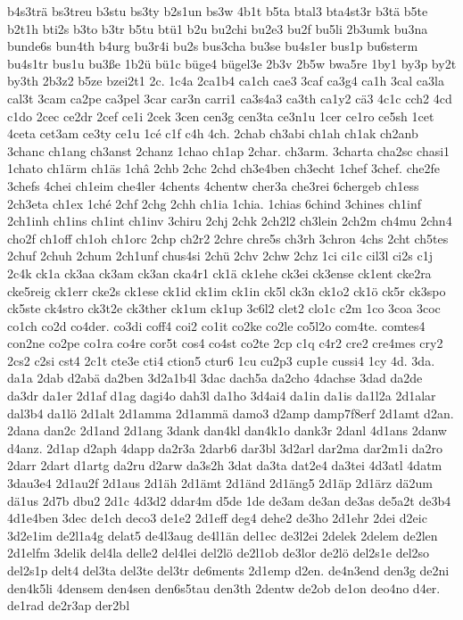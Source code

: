 {b4s3trä
bs3treu
b3stu
bs3ty
b2s1un
bs3w
4b1t
b5ta
btal3
bta4st3r
b3tä
b5te
b2t1h
bti2s
b3to
b3tr
b5tu
btü1
b2u
bu2chi
bu2e3
bu2f
bu5li
2b3umk
bu3na
bunde6s
bun4th
b4urg
bu3r4i
bu2s
bus3cha
bu3se
bu4s1er
bus1p
bu6sterm
bu4s1tr
bus1u
bu3ße
1b2ü
bü1c
büge4
bügel3e
2b3v
2b5w
bwa5re
1by1
by3p
by2t
by3th
2b3z2
b5ze
bzei2t1
2c.
1c4a
2ca1b4
ca1ch
cae3
3caf
ca3g4
ca1h
3cal
ca3la
cal3t
3cam
ca2pe
ca3pel
3car
car3n
carri1
ca3s4a3
ca3th
ca1y2
cä3
4c1c
cch2
4cd
c1do
2cec
ce2dr
2cef
ce1i
2cek
3cen
cen3g
cen3ta
ce3n1u
1cer
ce1ro
ce5sh
1cet
4ceta
cet3am
ce3ty
ce1u
1cé
c1f
c4h
4ch.
2chab
ch3abi
ch1ah
ch1ak
ch2anb
3chanc
ch1ang
ch3anst
2chanz
1chao
ch1ap
2char.
ch3arm.
3charta
cha2sc
chasi1
1chato
ch1ärm
ch1äs
1châ
2chb
2chc
2chd
ch3e4ben
ch3echt
1chef
3chef.
che2fe
3chefs
4chei
ch1eim
che4ler
4chents
4chentw
cher3a
che3rei
6chergeb
ch1ess
2ch3eta
ch1ex
1ché
2chf
2chg
2chh
ch1ia
1chia.
1chias
6chind
3chines
ch1inf
2ch1inh
ch1ins
ch1int
ch1inv
3chiru
2chj
2chk
2ch2l2
ch3lein
2ch2m
ch4mu
2chn4
cho2f
ch1off
ch1oh
ch1orc
2chp
ch2r2
2chre
chre5s
ch3rh
3chron
4chs
2cht
ch5tes
2chuf
2chuh
2chum
2ch1unf
chus4si
2chü
2chv
2chw
2chz
1ci
ci1c
cil3l
ci2s
c1j
2c4k
ck1a
ck3aa
ck3am
ck3an
cka4r1
ck1ä
ck1ehe
ck3ei
ck3ense
ck1ent
cke2ra
cke5reig
ck1err
cke2s
ck1ese
ck1id
ck1im
ck1in
ck5l
ck3n
ck1o2
ck1ö
ck5r
ck3spo
ck5ste
ck4stro
ck3t2e
ck3ther
ck1um
ck1up
3c6l2
clet2
clo1c
c2m
1co
3coa
3coc
co1ch
co2d
co4der.
co3di
coff4
coi2
co1it
co2ke
co2le
co5l2o
com4te.
comtes4
con2ne
co2pe
co1ra
co4re
cor5t
cos4
co4st
co2te
2cp
c1q
c4r2
cre2
cre4mes
cry2
2cs2
c2si
cst4
2c1t
cte3e
cti4
ction5
ctur6
1cu
cu2p3
cup1e
cussi4
1cy
4d.
3da.
da1a
2dab
d2abä
da2ben
3d2a1b4l
3dac
dach5a
da2cho
4dachse
3dad
da2de
da3dr
da1er
2d1af
d1ag
dagi4o
dah3l
da1ho
3d4ai4
da1in
da1is
da1l2a
2d1alar
dal3b4
da1lö
2d1alt
2d1amma
2d1ammä
damo3
d2amp
damp7f8erf
2d1amt
d2an.
2dana
dan2c
2d1and
2d1ang
3dank
dan4kl
dan4k1o
dank3r
2danl
4d1ans
2danw
d4anz.
2d1ap
d2aph
4dapp
da2r3a
2darb6
dar3bl
3d2arl
dar2ma
dar2m1i
da2ro
2darr
2dart
d1artg
da2ru
d2arw
da3s2h
3dat
da3ta
dat2e4
da3tei
4d3atl
4datm
3dau3e4
2d1au2f
2d1aus
2d1äh
2d1ämt
2d1änd
2d1äng5
2d1äp
2d1ärz
dä2um
dä1us
2d7b
dbu2
2d1c
4d3d2
ddar4m
d5de
1de
de3am
de3an
de3as
de5a2t
de3b4
4d1e4ben
3dec
de1ch
deco3
de1e2
2d1eff
deg4
dehe2
de3ho
2d1ehr
2dei
d2eic
3d2e1im
de2l1a4g
delat5
de4l3aug
de4l1än
del1ec
de3l2ei
2delek
2delem
de2len
2d1elfm
3delik
del4la
delle2
del4lei
del2lö
de2l1ob
de3lor
de2lö
del2s1e
del2so
del2s1p
delt4
del3ta
del3te
del3tr
de6ments
2d1emp
d2en.
de4n3end
den3g
de2ni
den4k5li
4densem
den4sen
den6s5tau
den3th
2dentw
de2ob
de1on
deo4no
d4er.
de1rad
de2r3ap
der2bl
}
